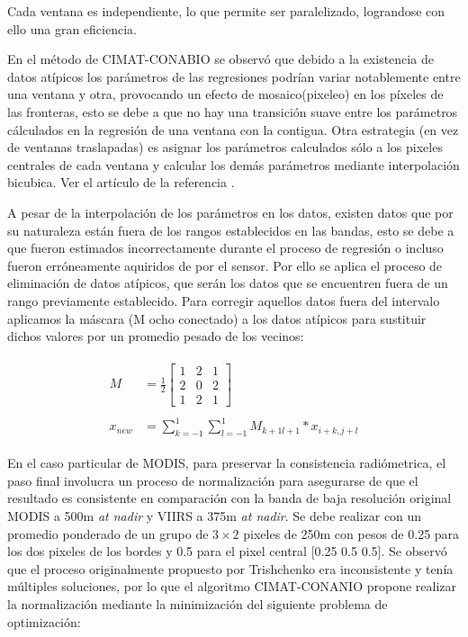 Cada ventana es independiente, lo que permite ser paralelizado, lograndose con ello una gran eficiencia. 

En el método de CIMAT-CONABIO se observó que debido a la existencia de datos atípicos los parámetros de las regresiones podrían variar notablemente entre una ventana y otra, provocando un efecto de mosaico(pixeleo) en los píxeles de las fronteras, esto se debe a que no hay una transición suave entre los parámetros cálculados en la regresión de una ventana con la contigua. Otra estrategia (en vez de ventanas traslapadas) es asignar los parámetros calculados sólo a los pixeles centrales de cada ventana y calcular los demás parámetros mediante interpolación bicubica. Ver el artículo de la referencia \cite{Judith}.

A pesar de la interpolación de los parámetros en los datos, existen datos que por su naturaleza están fuera de los rangos establecidos en las bandas, esto se debe a que fueron estimados incorrectamente durante el proceso de regresión o incluso fueron erróneamente aquiridos de por el sensor. Por ello se aplica el  proceso de eliminación de datos atípicos, que serán los datos que se encuentren fuera de un rango previamente establecido. Para corregir aquellos datos fuera del intervalo aplicamos la máscara (M ocho conectado) a los datos atípicos para sustituir dichos valores por un promedio pesado de los vecinos: 

\begin{eqnarray}
\label{filtro}
\begin{aligned}
M  & = \frac{1}{2} \begin{bmatrix}
1 & 2 & 1\\
2 & 0 & 2\\
1 & 2 & 1
\end{bmatrix}\\ \\ \nonumber
x_{new} & = \sum_{k=-1}^{1}\sum_{l=-1}^{1}M_{k+1l+1} * x_{i+k, j+l}
\end{aligned}
\end{eqnarray}

En el caso particular de MODIS, para preservar la consistencia  radiómetrica, el paso final involucra un proceso de normalización para asegurarse de que el resultado es consistente en comparación con la banda de baja resolución original MODIS a 500m \textit{at nadir} y VIIRS a 375m \textit{at nadir}. Se debe realizar con un promedio ponderado de un grupo de $3  \times 2$ pixeles de 250m con pesos de 0.25 para los dos pixeles de los bordes y 0.5 para el pixel central [0.25 0.5 0.5]. Se observó que el proceso originalmente propuesto por Trishchenko era inconsistente y tenía múltiples soluciones, por lo que el algoritmo CIMAT-CONANIO propone realizar la normalización mediante la minimización del siguiente problema de optimización: 

